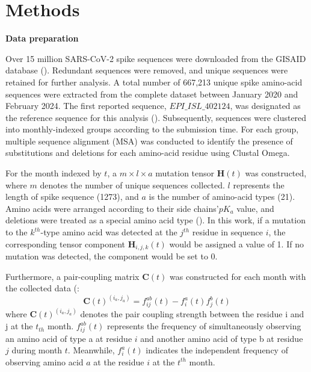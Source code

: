 \documentclass{sysbio}%
\begin{document}
\section{Methods}\label{sec1}

\textbf{Data preparation}

Over 15 million SARS-CoV-2 spike sequences were downloaded from the GISAID database  (\cite{gisaid}). Redundant sequences were removed, and unique sequences were retained for further analysis. A total number of 667,213 unique spike amino-acid sequences were extracted from the complete dataset between January 2020 and February 2024.  The first reported sequence, $EPI\_ISL\_402124$, was designated as the reference sequence for this analysis  (\cite{msa,SARS-CoV-2-outbreak}). Subsequently, sequences were clustered into monthly-indexed groups according to the submission time. For each group, multiple sequence alignment (MSA) was conducted to identify the presence of substitutions and deletions for each amino-acid residue using Clustal Omega.


For the month indexed by $t$, a $m\times l \times a$ mutation tensor $\bm{H}(t)$ was constructed, where $m$ denotes the number of unique sequences collected. $l$ represents the length of spike sequence (1273), and $a$ is the number of amino-acid types (21). Amino acids were arranged according to their side chains’$pK_a$ value, and deletions were treated as a special amino acid type (\cite{pka}). In this work, if a mutation to the $k^{th}$-type amino acid was detected at the $j^{th}$ residue in sequence $i$, the corresponding tensor component $\bm{H}_{i,j,k}(t)$ would be assigned a value of 1. If no mutation was detected, the component would be set to 0.

Furthermore, a pair-coupling matrix $\bm{C}(t)$ was constructed for each month with the collected data (\cite{statistic}:
\begin{equation}
    \bm{C}(t)^{(i_a,j_a)}=f_{ij}^{ab}(t)-f_i^a(t) f_j^b(t)
\end{equation}
where $\bm{C}(t)^{(i_a,j_a)}$ denotes the pair coupling strength between the residue i and j at the $t_{th}$ month. $f_{ij}^{ab} (t)$ represents the frequency of simultaneously observing an amino acid of type a at residue $i$ and another amino acid of type b at residue $j$ during month $t$. Meanwhile, $f_{i}^{a}(t)$  indicates the independent frequency of observing amino acid $a$ at the residue $i$ at the $t^{th}$ month.
\end{document}

